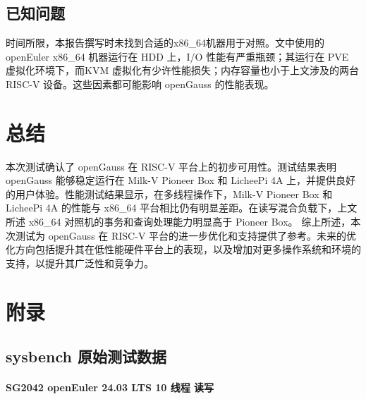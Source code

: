 \documentclass{article}
\begin{document}
\subsection{已知问题}

时间所限，本报告撰写时未找到合适的x86\_64机器用于对照。文中使用的 openEuler x86\_64 机器运行在 HDD 上，I/O 性能有严重瓶颈；其运行在 PVE 虚拟化环境下，而KVM 虚拟化有少许性能损失；内存容量也小于上文涉及的两台 RISC-V 设备。这些因素都可能影响 openGauss 的性能表现。

\section{总结}

本次测试确认了 openGauss 在 RISC-V 平台上的初步可用性。测试结果表明 openGauss 能够稳定运行在 Milk-V Pioneer Box 和 LicheePi 4A 上，并提供良好的用户体验。性能测试结果显示，在多线程操作下，Milk-V Pioneer Box 和 LicheePi 4A 的性能与 x86\_64 平台相比仍有明显差距。在读写混合负载下，上文所述 x86\_64 对照机的事务和查询处理能力明显高于 Pioneer Box。
综上所述，本次测试为 openGauss 在 RISC-V 平台的进一步优化和支持提供了参考。未来的优化方向包括提升其在低性能硬件平台上的表现，以及增加对更多操作系统和环境的支持，以提升其广泛性和竞争力。

\newpage
\appendix

\section{附录}

\subsection{sysbench 原始测试数据}

\paragraph{SG2042 openEuler 24.03 LTS 10 线程 读写}
\end{document}
